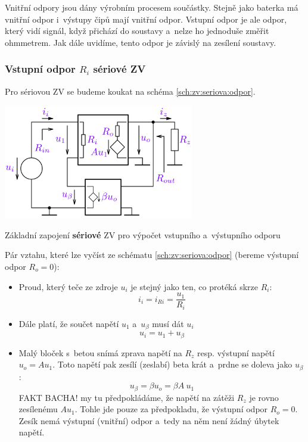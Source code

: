 \documentclass[a4paper,12pt]{article}   %
\begin{document}
Vnitřní odpory jsou dány výrobním procesem součástky. Stejně jako baterka má vnitřní odpor i~výstupy čipů mají vnitřní odpor. Vstupní odpor je ale odpor, který vidí signál, když přichází do soustavy a~nelze ho jednoduše změřit ohmmetrem. Jak dále uvidíme, tento odpor je závislý na zesílení soustavy.

\subsubsection*{Vstupní odpor $R_i$ sériové ZV}
Pro sériovou ZV se budeme koukat na schéma \ref{sch:zv:seriova:odpor}.
\begin{schema}[h!]
    \centering
    \includegraphics[height=5cm]{ZV_seriova-odpory.PNG}
    \caption{Základní zapojení \textbf{sériové} ZV pro výpočet vstupního a~výstupního odporu}
    \label{sch:zv:seriova:odpor}
\end{schema}

Pár vztahu, které lze vyčíst ze schématu \ref{sch:zv:seriova:odpor} (bereme výstupní odpor $R_o = 0$):
\begin{itemize}
    \item Proud, který teče ze zdroje $u_i$ je stejný jako ten, co protéká skrze $R_i$:
    \begin{equation}
        i_i = i_{Ri} = \frac{u_\text{1}}{R_i}
        \label{eq:ri}
    \end{equation}
    \item Dále platí, že součet napětí $u_\text{1}$ a~$u_\beta$ musí dát $u_i$
    \begin{equation}
        u_i = u_\text{1} + u_\beta
        \label{eq:soucet:napeti}
    \end{equation}
    \item Malý bloček s~betou snímá zprava napětí na $R_z$ resp. výstupní napětí $u_o = Au_\text{1}$. Toto napětí pak zesílí (zeslabí) beta krát a~prdne se doleva jako $u_\beta$:
    \begin{equation}
        u_\beta = \beta u_o = \beta A~u_\text{1}
        \label{eq:beta:napeti}
    \end{equation}
    FAKT BACHA! my tu předpokládáme, že napětí na zátěži $R_z$ je rovno zesílenému $Au_\text{1}$. Tohle jde pouze za předpokladu, že výstupní odpor $R_o = 0$. Zesík nemá výstupní (vnitřní) odpor a~tedy na něm není žádný úbytek napětí.
\end{itemize}
\end{document}
